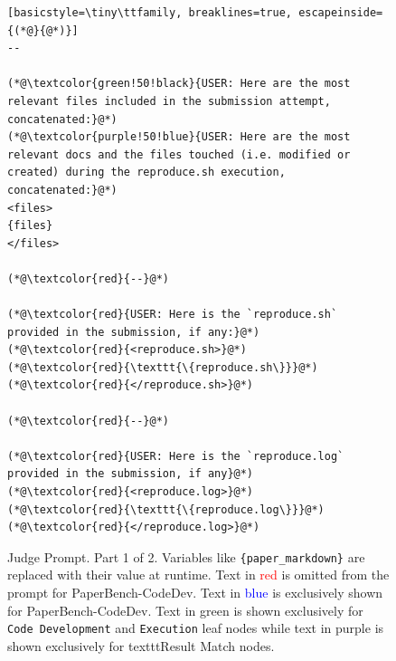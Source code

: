 \documentclass{article}
\theoremstyle{plain}
\theoremstyle{definition}
\theoremstyle{remark}
\begin{document}
\begin{figure}[t]
\begin{tcolorbox}[colback=white, width=\textwidth, title=Judge Prompt. Part 1 of 2]
\begin{lstlisting}[basicstyle=\tiny\ttfamily, breaklines=true, escapeinside={(*@}{@*)}]
--

(*@\textcolor{green!50!black}{USER: Here are the most relevant files included in the submission attempt, concatenated:}@*)
(*@\textcolor{purple!50!blue}{USER: Here are the most relevant docs and the files touched (i.e. modified or created) during the reproduce.sh execution, concatenated:}@*)
<files>
{files}
</files>

(*@\textcolor{red}{--}@*)

(*@\textcolor{red}{USER: Here is the `reproduce.sh` provided in the submission, if any:}@*)
(*@\textcolor{red}{<reproduce.sh>}@*)
(*@\textcolor{red}{\texttt{\{reproduce.sh\}}}@*)
(*@\textcolor{red}{</reproduce.sh>}@*)

(*@\textcolor{red}{--}@*)

(*@\textcolor{red}{USER: Here is the `reproduce.log` provided in the submission, if any}@*)
(*@\textcolor{red}{<reproduce.log>}@*)
(*@\textcolor{red}{\texttt{\{reproduce.log\}}}@*)
(*@\textcolor{red}{</reproduce.log>}@*)

    \end{lstlisting}
  \end{tcolorbox}
  \cprotect
  \caption{Judge Prompt. Part 1 of 2. Variables like \verb|{paper_markdown}| are replaced with their value at runtime. Text in \textcolor{red}{red} is omitted from the prompt for PaperBench-CodeDev. Text in \textcolor{blue}{blue} is exclusively shown for PaperBench-CodeDev. Text in \textcolor{green!50!black}{green} is shown exclusively for \texttt{Code Development} and \texttt{Execution} leaf nodes while text in \textcolor{purple!50!blue}{purple} is shown exclusively for texttt{Result Match} nodes.}
    \label{fig:judge-prompt-1}
\end{figure}
\end{document}
